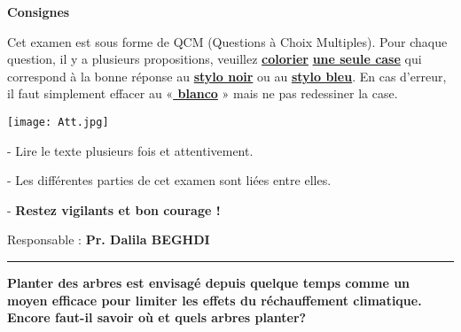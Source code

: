 \documentclass[a3paper,landscape,10pt]{article}
\begin{document}
{\begin{multicols}{2}
{\begin{minipage}[b]{8.5cm}
{{\begin{minipage}{.9\linewidth}
\end{minipage}
}}\hfill\vspace{-1ex}\end{minipage}\hspace*{\fill}

}
\vspace{-4mm}
\begin{center}\em
\begin{center} \large \bf Consignes \end{center}
\begin{center}
Cet examen est sous forme de QCM (Questions à Choix Multiples). Pour chaque question, il y a plusieurs propositions, veuillez \textbf{ \underline{colorier}} \textbf{\underline{une seule case}} qui correspond à la bonne réponse au \textbf{\underline{stylo noir}} ou au \textbf{\underline{stylo bleu}}.
  En cas d'erreur, il faut simplement effacer au «\textbf{\underline{ blanco}} » mais ne pas redessiner la case.
 \begin{minipage}[c]{.5\linewidth}
\texttt{[image: Att.jpg]}
\end{minipage}
\begin{flushleft}
- Lire le texte plusieurs fois et attentivement.

- Les différentes parties de cet examen sont liées entre elles.

- \large{\textbf{Restez vigilants et bon courage !}}

  \end{flushleft}
  \end{center}

  Responsable : \textbf{Pr. Dalila BEGHDI }
\end{center}

\begin{flushleft}\hrule\vspace{4mm}\begin{center}
\large{ \textbf{Planter des arbres est envisagé depuis quelque temps comme un moyen efficace pour limiter les effets du réchauffement climatique. Encore faut-il savoir où et quels arbres planter? } }\\

\begin{flushleft}
\begin{flushleft}


\end{flushleft}
\end{flushleft}
\end{center}
\end{flushleft}
\end{multicols}}
\end{document}
